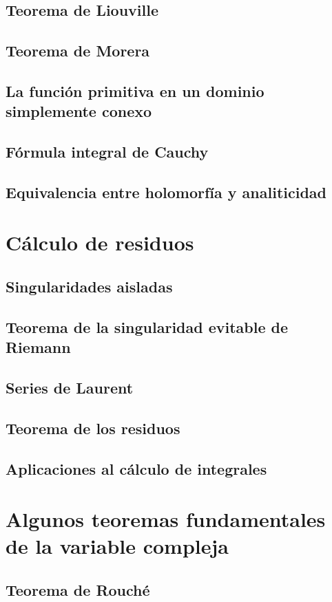 \documentclass{apuntes}
\begin{document}
\section{Teorema de Liouville}
\section{Teorema de Morera}
\section{La función primitiva en un dominio simplemente conexo}
\section{Fórmula integral de Cauchy}
\section{Equivalencia entre holomorfía y analiticidad}


\chapter{Cálculo de residuos}
\section{Singularidades aisladas}
\section{Teorema de la singularidad evitable de Riemann}
\section{Series de Laurent}
\section{Teorema de los residuos}
\section{Aplicaciones al cálculo de integrales}


\chapter{Algunos teoremas fundamentales de la variable compleja}
\section{Teorema de Rouché}
\end{document}
